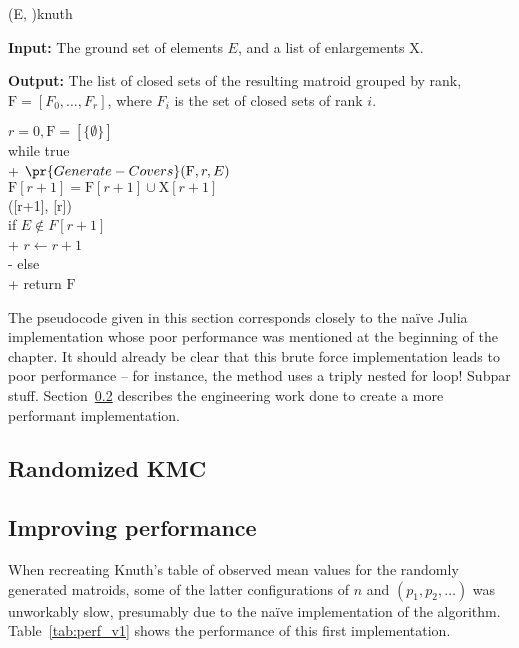 \begin{algorithm}[float*=ht!]{(E, )}{knuth}

  \textbf{Input:}     \tab The ground set of elements $E$, and a list of enlargements $\mathrm{X}$.

  \textbf{Output:}    \tab The list of closed sets of the resulting matroid grouped by rank, \\
  \mbox{}\tab $\mathrm{F} = [F_0, \ldots, F_r]$, where $F_i$ is the set of closed sets of rank $i$.

  \begin{pseudo}[label=\small\arabic*, indent-mark, line-height=1.2]
    $r = 0, \mathrm{F} = [\{ \emptyset \}]$ \\
    while true  \\+
    $\pr{Generate-Covers}(\mathrm{F}, r, E)$ \\
    $\mathrm{F}[r+1] = \mathrm{F}[r+1] \cup \mathrm{X}[r+1]$ \\
    ([r+1], [r]) \\

    if $E \not \in F[r+1]$ \\+
    $r \leftarrow r+1$ \\-
    else \\+
    return $\mathrm{F}$

  \end{pseudo}

\end{algorithm}

The pseudocode given in this section corresponds closely to the naïve Julia implementation whose poor performance was mentioned at the beginning of the chapter. It should already be clear that this brute force implementation leads to poor performance -- for instance, the  method uses a triply nested for loop! Subpar stuff. Section~\ref{sec:improving-performance} describes the engineering work done to create a more performant implementation.

\subsection{Randomized KMC}
\skelpars[3]

\subsection{Improving performance}
\label{sec:improving-performance}
When recreating Knuth's table of observed mean values for the randomly generated matroids, some of the latter configurations of $n$ and $(p_1, p_2, \ldots)$ was unworkably slow, presumably due to the naïve implementation of the algorithm. Table~\ref{tab:perf_v1} shows the performance of this first implementation.

